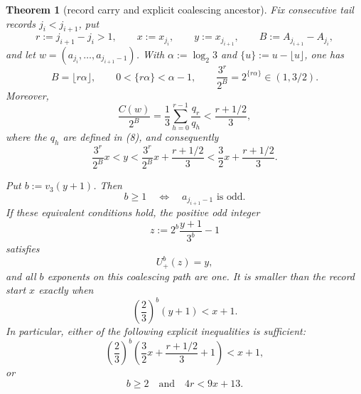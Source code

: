 \documentclass[11pt]{article}
\newtheorem{theorem}{Theorem}
\newcommand{\Up}{U_+}
\begin{document}
\begin{theorem}[record carry and explicit coalescing ancestor]
Fix consecutive tail records $j_i<j_{i+1}$, put
\[
  r:=j_{i+1}-j_i>1,
  \qquad
  x:=x_{j_i},
  \qquad
  y:=x_{j_{i+1}},
  \qquad
  B:=A_{j_{i+1}}-A_{j_i},
  \tag{26}
\]
and let $w=(a_{j_i},\ldots,a_{j_{i+1}-1})$.  With
$\alpha:=\log_2 3$ and $\{u\}:=u-\lfloor u\rfloor$, one has
\[
  B=\lfloor r\alpha\rfloor,
  \qquad
  0<\{r\alpha\}<\alpha-1,
  \qquad
  \frac{3^r}{2^B}=2^{\{r\alpha\}}\in(1,3/2).
  \tag{27}
\]
Moreover,
\[
  \frac{C(w)}{2^B}
  =\frac13\sum_{h=0}^{r-1}\frac{q_r}{q_h}
  <\frac{r+1/2}{3},
  \tag{28}
\]
where the $q_h$ are defined in (8), and consequently
\[
  \frac{3^r}{2^B}x
  <y
  <\frac{3^r}{2^B}x+\frac{r+1/2}{3}
  <\frac32x+\frac{r+1/2}{3}.
  \tag{29}
\]

Put $b:=v_3(y+1)$.  Then
\[
  b\geq1
  \quad\Longleftrightarrow\quad
  a_{j_{i+1}-1}\text{ is odd}.
  \tag{30}
\]
If these equivalent conditions hold, the positive odd integer
\[
  z:=2^b\frac{y+1}{3^b}-1
  \tag{31}
\]
satisfies
\[
  \Up^b(z)=y,
  \tag{32}
\]
and all $b$ exponents on this coalescing path are one.  It is smaller than
the record start $x$ exactly when
\[
  \left(\frac23\right)^b(y+1)<x+1.
  \tag{33}
\]
In particular, either of the following explicit inequalities is sufficient:
\[
  \left(\frac23\right)^b
  \left(
    \frac32x+\frac{r+1/2}{3}+1
  \right)<x+1,
  \tag{34}
\]
or
\[
  b\geq2
  \quad\text{and}\quad
  4r<9x+13.
  \tag{35}
\]
\end{theorem}
\end{document}
